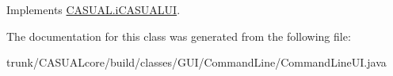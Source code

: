 Implements \hyperlink{interface_c_a_s_u_a_l_1_1i_c_a_s_u_a_l_u_i_a8dcf6547f0bf15b2fb7ac176d8e649c1}{C\-A\-S\-U\-A\-L.\-i\-C\-A\-S\-U\-A\-L\-U\-I}.



The documentation for this class was generated from the following file\-:\begin{DoxyCompactItemize}
\item 
trunk/\-C\-A\-S\-U\-A\-Lcore/build/classes/\-G\-U\-I/\-Command\-Line/Command\-Line\-U\-I.\-java\end{DoxyCompactItemize}
